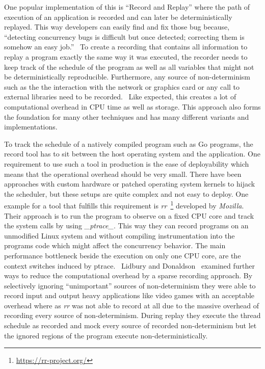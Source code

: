 \documentclass[conference]{IEEEtran}
\begin{document}
One popular implementation of this is ``Record and Replay'' where the path of execution of an application is recorded and can later be deterministically replayed.
This way developers can easily find and fix those bug because, ``detecting concurrency bugs is difficult but once detected; correcting them is somehow an easy job.''~\cite{tchamgoue2012testing}
To create a recording that contains all information to replay a program exactly the same way it was executed, the recorder needs to keep track of the schedule of the program as well as all variables that might not be deterministically reproducible.
Furthermore, any source of non-determinism such as the the interaction with the network or graphics card or any call to external libraries need to be recorded.~\cite{lidbury2019sparse}
Like expected, this creates a lot of computational overhead in CPU time as well as storage.
This approach also forms the foundation for many other techniques and has many different variants and implementations.

To track the schedule of a natively compiled program such as Go programs, the record tool has to sit between the host operating system and the application.
One requirement to use such a tool in production is the ease of deployability which means that the operational overhead should be very small.
There have been approaches with custom hardware or patched operating system kernels to hijack the scheduler, but these setups are quite complex and not easy to deploy.
One example for a tool that fulfills this requirement is \emph{rr}~\footnote{\url{https://rr-project.org/}} developed by \emph{Mozilla}.
Their approach is to run the program to observe on a fixed CPU core and track the system calls by using \emph{\_ptrace\_}.
This way they can record programs on an unmodified Linux system and without compiling instrumentation into the programs code which might affect the concurrency behavior.
The main performance bottleneck beside the execution on only one CPU core, are the context switches induced by ptrace.~\cite{o2017engineering}
Lidbury and Donaldson~\cite{lidbury2019sparse} examined further ways to reduce the computational overhead by a sparse recording approach.
By selectively ignoring ``unimportant'' sources of non-determinism they were able to record input and output heavy applications like video games with an acceptable overhead where as \emph{rr} was not able to record at all due to the massive overhead of recording every source of non-determinism.
During replay they execute the thread schedule as recorded and mock every source of recorded non-determinism but let the ignored regions of the program execute non-deterministically.
\end{document}
